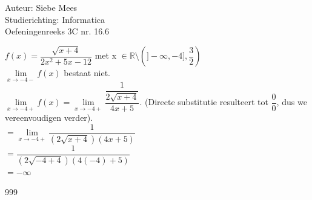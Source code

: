 \documentclass[a4paper]{article}
\begin{document}
  
\noindent \large Auteur: Siebe Mees \\
\noindent \large Studierichting: Informatica\\
\noindent \large Oefeningenreeks 3C nr. 16.6\\

\medskip

\normalsize

$ f(x) = \dfrac{\sqrt{x+4}}{2x^2+5x-12}$ met x $\in \mathbb{R} \setminus  \left( ]-\infty ,-4]  , \dfrac{3}{2}\right)$\\

$\lim\limits_{x \rightarrow -4-} f(x)$ bestaat niet.\\

$\lim\limits_{x \rightarrow -4+} f(x) = \lim\limits_{x \rightarrow -4+} \dfrac{\dfrac{1}{2\sqrt{x+4}}}{4x+5}$. (Directe substitutie resulteert tot $\dfrac{0}{0}$, dus we vereenvoudigen verder). \\

$= \lim\limits_{x \rightarrow -4+} \dfrac{1}{(2\sqrt{x+4})(4x+5)}$\\

$= \dfrac{1}{(2\sqrt{-4+4})(4(-4)+5)}$\\

$ = -\infty$\\


\begin{thebibliography}{999}
\end{thebibliography}
\end{document}
